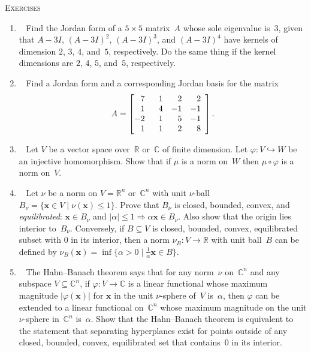 \documentclass[11pt]{article}
\newcommand\score[1]{\marginpar{\vspace{-2ex}\color{blue}{#1/3}}\hspace{-1ex}}
\newcommand\0{\mathbf{0}}
\newcommand\CC{\mathbb{C}}
\newcommand\RR{\mathbb{R}}
\newcommand\xx{\mathbf{x}}
\newcommand\into{\hookrightarrow}
\newcommand\<{\langle}
\renewcommand\>{\rangle}
\renewcommand\implies{\Rightarrow}
\begin{document}
\noindent
\textsc{Exercises}%

\begin{enumerate}
\item\ \score{}%
Find the Jordan form of a $5 \times 5$ matrix~$A$ whose sole
eigenvalue is~$3$, given that $A - 3I$, $(A - 3I)^2$, $(A - 3I)^3$,
and $(A - 3I)^4$ have kernels of dimension $2$, $3$, $4$, and~$5$,
respectively.  Do the same thing if the kernel dimensions are $2$,
$4$, $5$, and~$5$, respectively.

\item\ \score{}%
Find a Jordan form and a corresponding Jordan basis for the matrix
$$%
A =
\left[
\begin{array}{@{}rrrr}
   7\ &\ 1 &  2 &  2 \\
   1\ &\ 4 & -1 & -1 \\
  -2\ &\ 1 &  5 & -1 \\
   1\ &\ 1 &  2 &  8 
\end{array}
\right].
$$%

\item\ \score{}%
Let $V$ be a vector space over~$\RR$ or~$\CC$ of finite dimension.
Let $\varphi: V \into W$ be an injective homomorphism.  Show that if
$\mu$ is a norm on~$W$ then $\mu \circ \varphi$ is a norm on~$V$.

\item\ \score{}%
Let $\nu$ be a norm on $V = \RR^n$ or~$\CC^n$ with unit $\nu$-ball
$B_\nu = \{\xx \in V \mid \nu(\xx) \leq 1\}$.  Prove that $B_\nu$ is
closed, bounded, convex, and \emph{equilibrated}: $\xx \in B_\nu$ and
$|\alpha| \leq 1 \implies \alpha\xx \in B_\nu$.  Also show that the
origin lies interior to~$B_\nu$.  Conversely, if $B \subseteq V$ is
closed, bounded, convex, equilibrated subset with $0$ in its interior,
then a norm $\nu_B: V \to \RR$ with unit ball~$B$ can be defined by
$\nu_B(\xx) = \inf\{\alpha > 0 \mid \frac 1\alpha \xx \in B\}$.

\item\ \score{}%
The Hahn--Banach theorem says that for any norm~$\nu$ on~$\CC^n$ and
any subspace $V \subseteq \CC^n$, if $\varphi: V \to \CC$ is a linear
functional whose maximum magnitude $|\varphi(\xx)|$ for $\xx$ in the
unit $\nu$-sphere of~$V$ is~$\alpha$, then $\varphi$ can be extended
to a linear functional on~$\CC^n$ whose maximum magnitude on the unit
$\nu$-sphere in~$\CC^n$ is~$\alpha$.  Show that the Hahn--Banach
theorem is equivalent to the statement that separating hyperplanes
exist for points outside of any closed, bounded, convex, equilibrated
set that contains~$0$ in its interior.


\end{enumerate}
\end{document}
